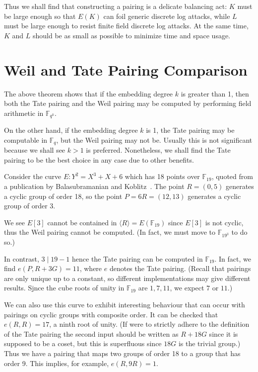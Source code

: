 Thus we shall find that constructing a pairing is a delicate balancing act:
$K$ must be large enough
so that $E(K)$ can foil generic discrete log attacks, while $L$ must be
large enough to resist finite field discrete log attacks. At the same time,
$K$ and $L$ should be as small as possible to minimize time and space
usage.

\section {Weil and Tate Pairing Comparison}

The above theorem shows that if the embedding degree $k$ is greater than 1,
then both the Tate pairing and the Weil pairing may be computed by
performing field arithmetic in $\mathbb{F}_{q^k}$.

On the other hand, if the embedding degree $k$ is 1, the Tate pairing may
be computable in $\mathbb{F}_q$, but the Weil pairing may not be.
Usually this is not significant because we shall see
$k > 1$ is preferred.
Nonetheless, we shall find the Tate pairing to be the best choice in
any case due to other benefits.

Consider the curve $E: Y^2 = X^3 + X + 6$ which has
18 points over $\mathbb{F}_{19}$, quoted from a publication by
Balasubramanian and Koblitz~\cite{bk}.
The point $R=(0,5)$ generates a cyclic group of order 18,
so the point $P = 6R = (12,13)$ generates a cyclic group of order 3.

We see $E[3]$ cannot be contained in $\langle R \rangle = E(\mathbb{F}_{19})$
since $E[3]$ is not cyclic, thus the Weil pairing cannot be computed.
(In fact, we must move to $\mathbb{F}_{19^3}$ to do so.)

In contrast, $3 \mid 19-1$ hence the Tate pairing can be
computed in $\mathbb{F}_{19}$. In fact, we find $e(P, R + 3G) = 11$, where
$e$ denotes the Tate pairing.
(Recall that pairings are only unique up to a constant, so different
implementations may give different results.
Sjnce the cube roots of unity in
$\mathbb{F}_{19}$ are $1, 7, 11$, we expect $7$ or $11$.)

We can also use this curve to exhibit
interesting behaviour that can occur with
pairings on cyclic groups with composite order.
It can be checked that $e(R, R) = 17$, a ninth root of unity.
(If were to strictly adhere to the definition of the Tate pairing
the second input should be written as $R + 18G$ since it is supposed to be
a coset, but this is superfluous since $18G$ is the trivial group.)
Thus we have a pairing that maps two groups of order 18
to a group that has order 9.
This implies, for example, $e(R, 9R) = 1$.

